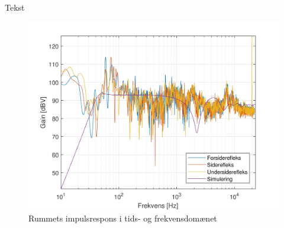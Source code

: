 \newpage
Tekst
\begin{figure}[H]
	\centering
	\vspace{-12pt}
	\includegraphics[width=\textwidth]{Billeder/Grafer/RealListen}
	\caption{Rummets impulsrespons i tids- og frekvensdomænet}
\end{figure}